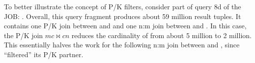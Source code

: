 To better illustrate the concept of P/K filters, consider part of query 8d of the JOB: . Overall, this query fragment produces about 59 million result tuples. It contains one P/K join between  and  and one n:m join between  and . In this case, the P/K join $mc \bowtie cn$ reduces the cardinality of  from about 5 million to 2 million. This essentially halves the work for the following n:m join between  and , since  ``filtered'' its P/K partner.
